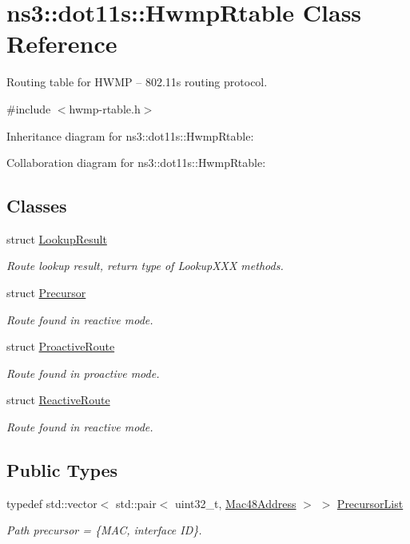 \hypertarget{classns3_1_1dot11s_1_1HwmpRtable}{}\section{ns3\+:\+:dot11s\+:\+:Hwmp\+Rtable Class Reference}
\label{classns3_1_1dot11s_1_1HwmpRtable}


Routing table for H\+W\+MP -- 802.\+11s routing protocol.  




{\ttfamily \#include $<$hwmp-\/rtable.\+h$>$}



Inheritance diagram for ns3\+:\+:dot11s\+:\+:Hwmp\+Rtable\+:


Collaboration diagram for ns3\+:\+:dot11s\+:\+:Hwmp\+Rtable\+:
\subsection*{Classes}
\begin{DoxyCompactItemize}
\item 
struct \hyperlink{structns3_1_1dot11s_1_1HwmpRtable_1_1LookupResult}{Lookup\+Result}
\begin{DoxyCompactList}\small\item\em Route lookup result, return type of Lookup\+X\+XX methods. \end{DoxyCompactList}\item 
struct \hyperlink{structns3_1_1dot11s_1_1HwmpRtable_1_1Precursor}{Precursor}
\begin{DoxyCompactList}\small\item\em Route found in reactive mode. \end{DoxyCompactList}\item 
struct \hyperlink{structns3_1_1dot11s_1_1HwmpRtable_1_1ProactiveRoute}{Proactive\+Route}
\begin{DoxyCompactList}\small\item\em Route found in proactive mode. \end{DoxyCompactList}\item 
struct \hyperlink{structns3_1_1dot11s_1_1HwmpRtable_1_1ReactiveRoute}{Reactive\+Route}
\begin{DoxyCompactList}\small\item\em Route found in reactive mode. \end{DoxyCompactList}\end{DoxyCompactItemize}
\subsection*{Public Types}
\begin{DoxyCompactItemize}
\item 
typedef std\+::vector$<$ std\+::pair$<$ uint32\+\_\+t, \hyperlink{classns3_1_1Mac48Address}{Mac48\+Address} $>$ $>$ \hyperlink{classns3_1_1dot11s_1_1HwmpRtable_a91366ab9155f7ff630c797a8d40262fc}{Precursor\+List}
\begin{DoxyCompactList}\small\item\em Path precursor = \{M\+AC, interface ID\}. \end{DoxyCompactList}\end{DoxyCompactItemize}
